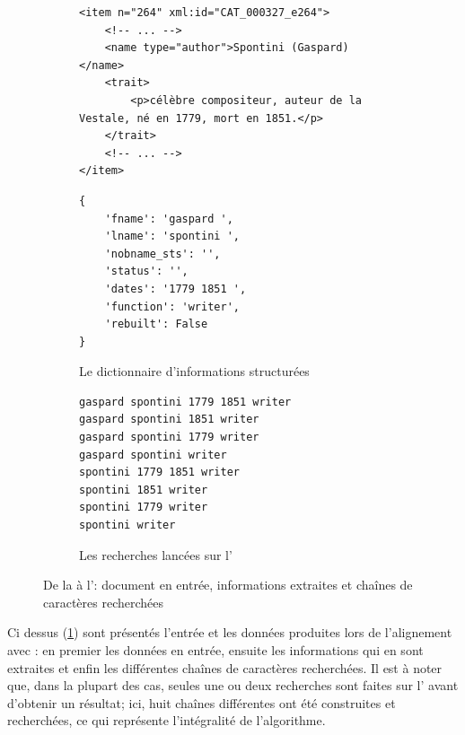 \clearpage
\begin{figure}[!htb]
	\begin{subfigure}{\textwidth}
		\begin{verbatim}
<item n="264" xml:id="CAT_000327_e264">
	<!-- ... -->
	<name type="author">Spontini (Gaspard)</name>
	<trait>
		<p>célèbre compositeur, auteur de la Vestale, né en 1779, mort en 1851.</p>
	</trait>
	<!-- ... -->
</item>
		\end{verbatim}
	\end{subfigure}
	\begin{subfigure}{\textwidth}
		\begin{verbatim}
{
	'fname': 'gaspard ', 
	'lname': 'spontini ', 
	'nobname_sts': '', 
	'status': '', 
	'dates': '1779 1851 ', 
	'function': 'writer', 
	'rebuilt': False
}
		\end{verbatim}
		\caption{Le dictionnaire d'informations structurées}
	\end{subfigure}
	\begin{subfigure}{\textwidth}
		\begin{lstlisting}
gaspard spontini 1779 1851 writer
gaspard spontini 1851 writer
gaspard spontini 1779 writer
gaspard spontini writer
spontini 1779 1851 writer
spontini 1851 writer
spontini 1779 writer
spontini writer
		\end{lstlisting}
		\caption{Les recherches lancées sur l'\api{} \wkd{}}
	\end{subfigure}
	\caption{De la \tei{} à l'\api{}: document en entrée, informations extraites et chaînes de caractères recherchées}
	\label{code:apipipeline}
\end{figure}
Ci dessus (\ref{code:apipipeline}) sont présentés l'entrée et les données produites lors de l'alignement avec \wkd{}: en premier les données en entrée, ensuite les informations qui en sont extraites et enfin les différentes chaînes de caractères recherchées. Il est à noter que, dans la plupart des cas, seules une ou deux recherches sont faites sur l'\api{} avant d'obtenir un résultat; ici, huit chaînes différentes ont été construites et recherchées, ce qui représente l'intégralité de l'algorithme.
\clearpage

